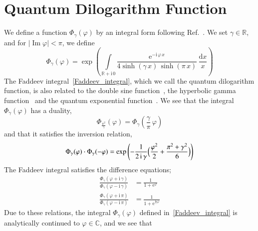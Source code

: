 \documentclass[12pt,reqno]{amsart}
\numberwithin{equation}{section}
\renewcommand{\Im}{\operatorname{Im}}
\newcommand{\I}{\mathrm{i}}
\newcommand{\E}{\mathrm{e}}
\begin{document}
\section{Quantum Dilogarithm Function}
\label{sec:dilog}
We define a function  $\Phi_\gamma(\varphi)$ by an integral form
following Ref.~.
We set
$\gamma \in \mathbb{R}$, and for 
$ | \Im \varphi | < \pi$, we define
\begin{equation}
  \label{Faddeev_integral}
  \Phi_\gamma(\varphi)
  =
  \exp
  \left(
    \int\limits_{\mathbb{R}+\I \, 0}
    \frac{\E^{- \I \, \varphi \, x}}
    {
      4 \sinh ( \gamma \, x) \, \sinh(\pi \, x)
      } \,
    \frac{\mathrm{d} x}{x}
  \right) 
\end{equation}
The Faddeev integral~\eqref{Faddeev_integral}, which we call the
quantum dilogarithm function, is also related to the
double sine function~\cite{KharLebeSeme01a,TShinta77a,NKurok91a},
the hyperbolic gamma function~\cite{Ruijse97a,EBarn01a}
and the quantum exponential function~\cite{SLWoron00a}.
We see that 
the integral  $\Phi_\gamma(\varphi)$ has a duality,
\begin{equation}
  \Phi_{\frac{\pi^2}{\gamma}} ( \varphi)
  =
  \Phi_{\gamma} \left(
    \frac{\gamma}{\pi} \, \varphi
  \right) 
\end{equation}
and that it satisfies the inversion relation,
\begin{equation}
  \label{inversion_Phi}
  \Phi_\gamma( \varphi ) \cdot \Phi_\gamma( - \varphi)
  =
  \exp
  \left(
    - \frac{1}{2 \, \I \, \gamma}
    \Bigl(
    \frac{\varphi^2}{2} + \frac{\pi^2 + \gamma^2}{6}
    \Bigr)
  \right) 
\end{equation}
The Faddeev integral satisfies the difference equations;
\begin{subequations}
  \begin{align}
    \frac{\Phi_\gamma(\varphi + \I \, \gamma)}
    {    \Phi_\gamma(\varphi - \I \, \gamma)}
    & =
    \frac{1}{1 + \E^\varphi}         
    \\[2mm]
%
    \frac{ \Phi_\gamma(\varphi + \I \, \pi)}{
      \Phi_\gamma(\varphi - \I \, \pi)}
    & =
    \frac{1}{1 + \E^{\frac{\pi}{\gamma}\varphi}} 
  \end{align}
\end{subequations}
Due to these relations, the integral $\Phi_\gamma(\varphi)$ defined
in~\eqref{Faddeev_integral}
is
analytically continued to $\varphi \in \mathbb{C}$,
and we see that
\end{document}
